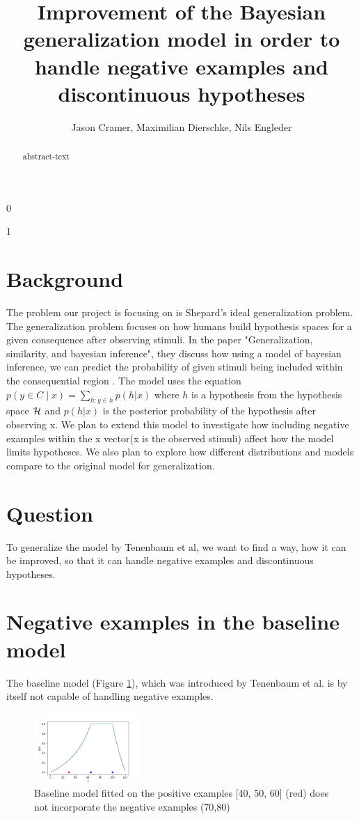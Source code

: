 \documentclass[12pt, ]{scrartcl}
\title{Improvement of the Bayesian generalization model in order to handle negative examples and discontinuous hypotheses}
\begin{document}
\def\isblind{1}
\if\isblind0
    \author{Jason Cramer, Maximilian Dierschke, Nils Engleder}\fi
\if \isblind1
    \author{}\fi

\maketitle
\begin{abstract}
	abstract-text
\end{abstract}
\doublespacing
\begin{multicols}{2}
\section{Background}
The problem our project is focusing on is Shepard's ideal generalization problem. The generalization problem focuses on how humans build hypothesis spaces for a given consequence after observing stimuli.
In the paper "Generalization, similarity, and bayesian inference", they discuss how using a model of bayesian inference, we can predict the probability of given stimuli being included within the consequential region \cite{Tenenbaum}.
The model uses the equation $p(y \in C \mid x) = \sum\limits_{h:y\in h} p(h | x)$ where $h$ is a hypothesis from the hypothesis space ${\cal H}$ and $p(h | x)$ is the posterior probability of  the hypothesis after observing x.
We plan to extend this model to investigate how including negative examples within the x vector(x is the observed stimuli) affect how the model limits hypotheses. We also plan to explore how different distributions and models compare to the original model for generalization.
\section{Question}
To generalize the model by Tenenbaum et al, we want to find a way, how it can be improved, so that it can handle negative examples and discontinuous hypotheses.

\section{Negative examples in the baseline model}
The baseline model (Figure \ref{fig:baseline}), which was introduced by Tenenbaum et al. is by itself not capable of handling negative examples.

\begin{figure}[t]
	\includegraphics[width=4cm]{graphics/baseline.png}
	\centering
	\caption{Baseline model fitted on the positive examples [40, 50, 60] (red) does not incorporate the negative examples (70,80) }
	\label{fig:baseline}
\end{figure}


\end{multicols}
\end{document}
